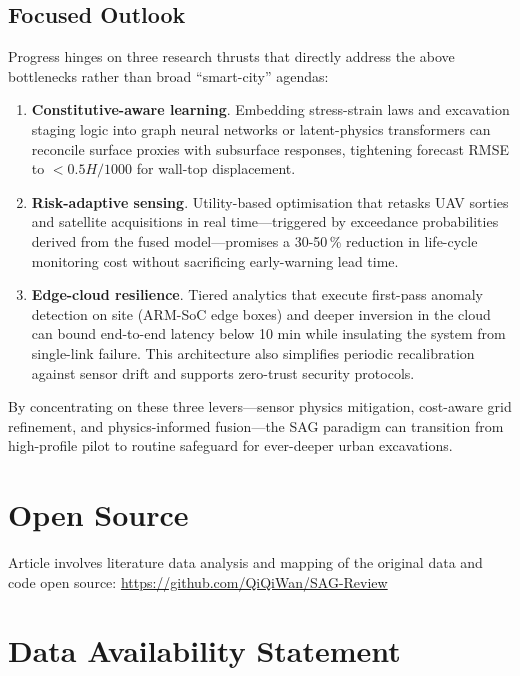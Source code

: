\documentclass[preprint,11pt,authoryear,3p]{elsarticle}
\begin{document}
\subsection{Focused Outlook}

Progress hinges on three research thrusts that directly address the above bottlenecks rather than broad “smart-city” agendas:

\begin{enumerate}
  \item \textbf{Constitutive-aware learning}.  Embedding stress-strain laws and excavation staging logic into graph neural networks or latent-physics transformers can reconcile surface proxies with subsurface responses, tightening forecast RMSE to $<0.5H/1000$ for wall-top displacement.

  \item \textbf{Risk-adaptive sensing}.  Utility-based optimisation that retasks UAV sorties and satellite acquisitions in real time—triggered by exceedance probabilities derived from the fused model—promises a 30-50\,\% reduction in life-cycle monitoring cost without sacrificing early-warning lead time.

  \item \textbf{Edge-cloud resilience}.  Tiered analytics that execute first-pass anomaly detection on site (ARM-SoC edge boxes) and deeper inversion in the cloud can bound end-to-end latency below 10 min while insulating the system from single-link failure.  This architecture also simplifies periodic recalibration against sensor drift and supports zero-trust security protocols.
\end{enumerate}

By concentrating on these three levers—sensor physics mitigation, cost-aware grid refinement, and physics-informed fusion—the SAG paradigm can transition from high-profile pilot to routine safeguard for ever-deeper urban excavations.

\section{Open Source}

Article involves literature data analysis and mapping of the original data and code open source: \url{https://github.com/QiQiWan/SAG-Review}

\section{Data Availability Statement}
\end{document}

